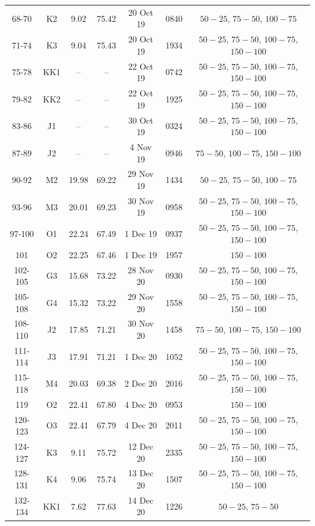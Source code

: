 \documentclass[authoryear,review,11pt]{elsarticle}
\begin{document}
\begin{scriptsize}
\begin{longtable}{ccccccc}
		68-70 & K2  & 9.02    & 75.42   & 20 Oct 19  & 0840  & $50-25$, $75-50$, $100-75$ \\
		71-74 & K3  & 9.04    & 75.43   & 20 Oct 19  & 1934  & $50-25$, $75-50$, $100-75$, $150-100$ \\
		75-78 & KK1 & --      & --      & 22 Oct 19  & 0742  & $50-25$, $75-50$, $100-75$, $150-100$ \\
		79-82 & KK2 & --      & --      & 22 Oct 19  & 1925  & $50-25$, $75-50$, $100-75$, $150-100$ \\
		83-86 & J1  & --      & --      & 30 Oct 19  & 0324  & $50-25$, $75-50$, $100-75$, $150-100$ \\
		87-89   & J2  & --      & --      & 4 Nov 19   & 0946  & $75-50$, $100-75$, $150-100$ \\
		90-92   & M2  & 19.98   & 69.22   & 29 Nov 19  & 1434  & $50-25$, $75-50$, $100-75$ \\
		93-96   & M3  & 20.01   & 69.23   & 30 Nov 19  & 0958  & $50-25$, $75-50$, $100-75$, $150-100$ \\
		97-100  & O1  & 22.24   & 67.49   & 1 Dec 19   & 0937  & $50-25$, $75-50$, $100-75$, $150-100$ \\
		101     & O2  & 22.25   & 67.46   & 1 Dec 19   & 1957  & $150-100$ \\
		\midrule
		102-105 & G3  & 15.68   & 73.22   & 28 Nov 20  & 0930  & $50-25$, $75-50$, $100-75$, $150-100$ \\
		105-108 & G4  & 15.32   & 73.22   & 29 Nov 20  & 1558  & $50-25$, $75-50$, $100-75$, $150-100$ \\
		108-110 & J2  & 17.85   & 71.21   & 30 Nov 20  & 1458  & $75-50$, $100-75$, $150-100$ \\
		111-114 & J3  & 17.91   & 71.21   & 1 Dec 20   & 1052  & $50-25$, $75-50$, $100-75$, $150-100$ \\
		115-118 & M4  & 20.03   & 69.38   & 2 Dec 20   & 2016  & $50-25$, $75-50$, $100-75$, $150-100$ \\
		119     & O2  & 22.41   & 67.80   & 4 Dec 20   & 0953  & $150-100$ \\
		120-123 & O3  & 22.41   & 67.79   & 4 Dec 20   & 2011  & $50-25$, $75-50$, $100-75$, $150-100$ \\
		124-127 & K3  & 9.11    & 75.72   & 12 Dec 20  & 2335  & $50-25$, $75-50$, $100-75$, $150-100$ \\
		128-131 & K4  & 9.06    & 75.74   & 13 Dec 20  & 1507  & $50-25$, $75-50$, $100-75$, $150-100$ \\
		132-134 & KK1 & 7.62    & 77.63   & 14 Dec 20  & 1226  & $50-25$, $75-50$ \\

\end{longtable}
\end{scriptsize}
\end{document}
